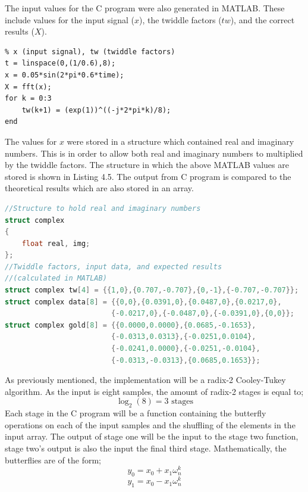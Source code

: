 \documentclass[12pt,a4paper]{report} %
\begin{document}
The input values for the C program were also generated in MATLAB. These include values for the input signal ($x$), the twiddle factors ($tw$), and the correct results ($X$).
\begin{lstlisting}[caption={Generating FFT input data in MATLAB},captionpos=b,frame=single]
% Generate input variables for C program
% x (input signal), tw (twiddle factors)
t = linspace(0,(1/0.6),8);
x = 0.05*sin(2*pi*0.6*time);
X = fft(x);
for k = 0:3
    tw(k+1) = (exp(1))^((-j*2*pi*k)/8);
end
\end{lstlisting}

The values for $x$ were stored in a structure which contained real and imaginary numbers.
This is in order to allow both real and imaginary numbers to multiplied by the twiddle factors.
The structure in which the above MATLAB values are stored is shown in Listing 4.5.
The output from C program is compared to the theoretical results which are also stored in an array.
\begin{lstlisting}[caption={Structure in C for complex numbers},captionpos=b,language=C,frame=single]
//Structure to hold real and imaginary numbers
struct complex
{
    float real, img;
};
//Twiddle factors, input data, and expected results
//(calculated in MATLAB)
struct complex tw[4] = {{1,0},{0.707,-0.707},{0,-1},{-0.707,-0.707}};
struct complex data[8] = {{0,0},{0.0391,0},{0.0487,0},{0.0217,0},
                         {-0.0217,0},{-0.0487,0},{-0.0391,0},{0,0}};
struct complex gold[8] = {{0.0000,0.0000},{0.0685,-0.1653},
                         {-0.0313,0.0313},{-0.0251,0.0104},
                         {-0.0241,0.0000},{-0.0251,-0.0104},
                         {-0.0313,-0.0313},{0.0685,0.1653}};
\end{lstlisting}

As previously mentioned, the implementation will be a radix-2 Cooley-Tukey algorithm.
As the input is eight samples, the amount of radix-2 stages is equal to;
\begin{equation} 
\log_2(8) = 3 \text{ stages}
\end{equation}
Each stage in the C program will be a function containing the butterfly operations on each of the input samples and the shuffling of the elements in the input array.
The output of stage one will be the input to the stage two function, stage two's output is also the input the final third stage.
Mathematically, the butterflies are of the form;
\begin{equation} 
y_0 = x_0 + x_1\omega^k_n
\end{equation}
\begin{equation} 
y_1 = x_0 - x_1\omega^k_n
\end{equation}
\end{document}
